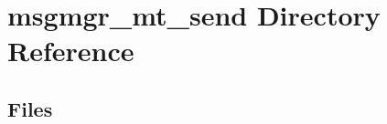 \section{msgmgr\+\_\+mt\+\_\+send Directory Reference}
\label{dir_a7aa682e1033a740c4c8bdbc0e91e17a}
\subsection*{Files}
\begin{DoxyCompactItemize}
\end{DoxyCompactItemize}
